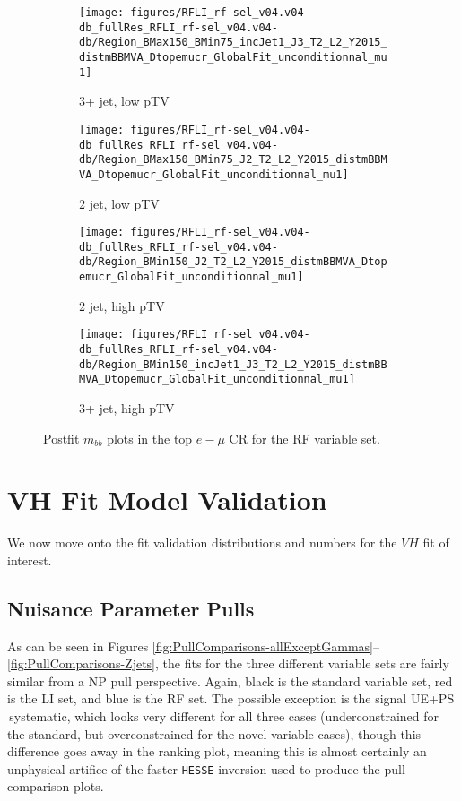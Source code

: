 \begin{figure}[!htbp]\captionsetup{justification=centering}
    \centering
\begin{subfigure}[t]{0.45000\textwidth}\centering\texttt{[image: figures/RFLI\_rf-sel\_v04.v04-db\_fullRes\_RFLI\_rf-sel\_v04.v04-db/Region\_BMax150\_BMin75\_incJet1\_J3\_T2\_L2\_Y2015\_distmBBMVA\_Dtopemucr\_GlobalFit\_unconditionnal\_mu1]}\caption{3+ jet, low pTV}\end{subfigure}
\begin{subfigure}[t]{0.45000\textwidth}\centering\texttt{[image: figures/RFLI\_rf-sel\_v04.v04-db\_fullRes\_RFLI\_rf-sel\_v04.v04-db/Region\_BMax150\_BMin75\_J2\_T2\_L2\_Y2015\_distmBBMVA\_Dtopemucr\_GlobalFit\_unconditionnal\_mu1]}\caption{2 jet, low pTV}\end{subfigure}
\begin{subfigure}[t]{0.45000\textwidth}\centering\texttt{[image: figures/RFLI\_rf-sel\_v04.v04-db\_fullRes\_RFLI\_rf-sel\_v04.v04-db/Region\_BMin150\_J2\_T2\_L2\_Y2015\_distmBBMVA\_Dtopemucr\_GlobalFit\_unconditionnal\_mu1]}\caption{2 jet, high pTV}\end{subfigure}
\begin{subfigure}[t]{0.45000\textwidth}\centering\texttt{[image: figures/RFLI\_rf-sel\_v04.v04-db\_fullRes\_RFLI\_rf-sel\_v04.v04-db/Region\_BMin150\_incJet1\_J3\_T2\_L2\_Y2015\_distmBBMVA\_Dtopemucr\_GlobalFit\_unconditionnal\_mu1]}\caption{3+ jet, high pTV}\end{subfigure}
  \caption{Postfit $m_{bb}$ plots in the top $e-\mu$ CR for the RF variable set.}
  \label{fig:RFPostfittopemuvz}
\end{figure}

\clearpage

\section{VH Fit Model Validation}
We now move onto the fit validation distributions and numbers for the $VH$ fit of interest.
\subsection{Nuisance Parameter Pulls}
As can be seen in Figures \ref{fig:PullComparisons-allExceptGammas}--\ref{fig:PullComparisons-Zjets}, the fits for the three different variable sets are fairly similar from a NP pull perspective.  Again, black is the standard variable set, red is the LI set, and blue is the RF set.  The possible exception is the signal UE+PS \ptv\,systematic, which looks very different for all three cases (underconstrained for the standard, but overconstrained for the novel variable cases), though this difference goes away in the ranking plot, meaning this is almost certainly an unphysical artifice of the faster \texttt{HESSE} inversion used to produce the pull comparison plots.

